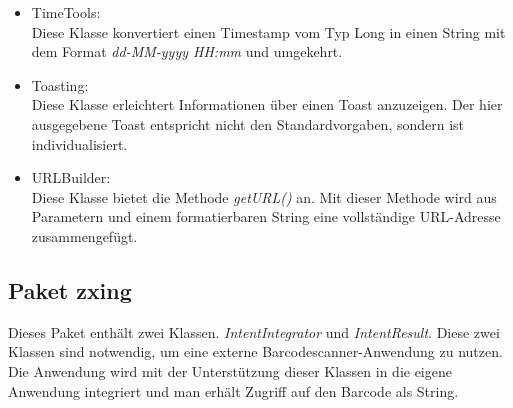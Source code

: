 \begin{itemize}
 \item TimeTools:\\
 Diese Klasse konvertiert einen Timestamp vom Typ Long in einen String mit dem Format \emph{dd-MM-yyyy HH:mm} und umgekehrt.
 
 \item Toasting:\\
 Diese Klasse erleichtert Informationen \"uber einen Toast anzuzeigen.
 Der hier ausgegebene Toast entspricht nicht den Standardvorgaben, sondern ist individualisiert.
 
 \item URLBuilder:\\
 Diese Klasse bietet die Methode \emph{getURL()} an.
 Mit dieser Methode wird aus Parametern und einem formatierbaren String eine vollst\"andige URL-Adresse zusammengef\"ugt.
\end{itemize}

\subsection*{Paket zxing}

Dieses Paket enth\"alt zwei Klassen.
\emph{IntentIntegrator} und \emph{IntentResult}.
Diese zwei Klassen sind notwendig, um eine externe Barcodescanner-Anwendung zu nutzen.
Die Anwendung wird mit der Unterst\"utzung dieser Klassen in die eigene Anwendung integriert 
und man erh\"alt Zugriff auf den Barcode als String. \\
